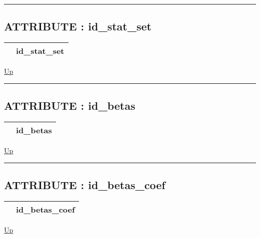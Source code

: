 \par


\rule{\textwidth}{0.4pt}
\subsection*{ATTRIBUTE : id\_stat\_set}
\hypertarget{ecldoc:logisticregression.constants.id_stat_set}{}

{\renewcommand{\arraystretch}{1.5}
\begin{tabularx}{\textwidth}{|>{\raggedright\arraybackslash}l|X|}
\hline
\hspace{0pt} & id\_stat\_set \\
\hline
\end{tabularx}
}

\hyperlink{ecldoc:LogisticRegression.Constants}{Up}

\par


\rule{\textwidth}{0.4pt}
\subsection*{ATTRIBUTE : id\_betas}
\hypertarget{ecldoc:logisticregression.constants.id_betas}{}

{\renewcommand{\arraystretch}{1.5}
\begin{tabularx}{\textwidth}{|>{\raggedright\arraybackslash}l|X|}
\hline
\hspace{0pt} & id\_betas \\
\hline
\end{tabularx}
}

\hyperlink{ecldoc:LogisticRegression.Constants}{Up}

\par


\rule{\textwidth}{0.4pt}
\subsection*{ATTRIBUTE : id\_betas\_coef}
\hypertarget{ecldoc:logisticregression.constants.id_betas_coef}{}

{\renewcommand{\arraystretch}{1.5}
\begin{tabularx}{\textwidth}{|>{\raggedright\arraybackslash}l|X|}
\hline
\hspace{0pt} & id\_betas\_coef \\
\hline
\end{tabularx}
}

\hyperlink{ecldoc:LogisticRegression.Constants}{Up}

